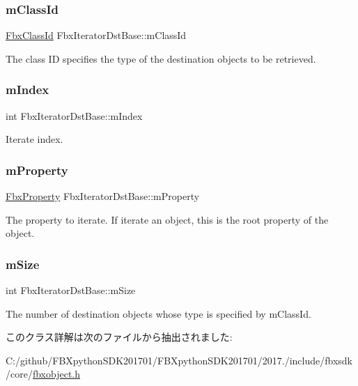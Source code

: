 \subsubsection{\texorpdfstring{m\+Class\+Id}{mClassId}}
{\footnotesize\ttfamily \hyperlink{class_fbx_class_id}{Fbx\+Class\+Id} Fbx\+Iterator\+Dst\+Base\+::m\+Class\+Id\hspace{0.3cm}{\ttfamily [protected]}}

The class ID specifies the type of the destination objects to be retrieved. \mbox{\label{class_fbx_iterator_dst_base_ad24255785c3869f0c76d37aa4cedf6aa}} 
\subsubsection{\texorpdfstring{m\+Index}{mIndex}}
{\footnotesize\ttfamily int Fbx\+Iterator\+Dst\+Base\+::m\+Index\hspace{0.3cm}{\ttfamily [protected]}}

Iterate index. \mbox{\label{class_fbx_iterator_dst_base_a3f4bd3e4d6427c2183c2fae3c3cc3033}} 
\subsubsection{\texorpdfstring{m\+Property}{mProperty}}
{\footnotesize\ttfamily \hyperlink{class_fbx_property}{Fbx\+Property} Fbx\+Iterator\+Dst\+Base\+::m\+Property\hspace{0.3cm}{\ttfamily [protected]}}

The property to iterate. If iterate an object, this is the root property of the object. \mbox{\label{class_fbx_iterator_dst_base_a9bac54bd7497f350e9a7f8be88d711eb}} 
\subsubsection{\texorpdfstring{m\+Size}{mSize}}
{\footnotesize\ttfamily int Fbx\+Iterator\+Dst\+Base\+::m\+Size\hspace{0.3cm}{\ttfamily [protected]}}

The number of destination objects whose type is specified by m\+Class\+Id. 

このクラス詳解は次のファイルから抽出されました\+:\begin{DoxyCompactItemize}
\item 
C\+:/github/\+F\+B\+Xpython\+S\+D\+K201701/\+F\+B\+Xpython\+S\+D\+K201701/2017./include/fbxsdk/core/\hyperlink{fbxobject_8h}{fbxobject.\+h}\end{DoxyCompactItemize}

